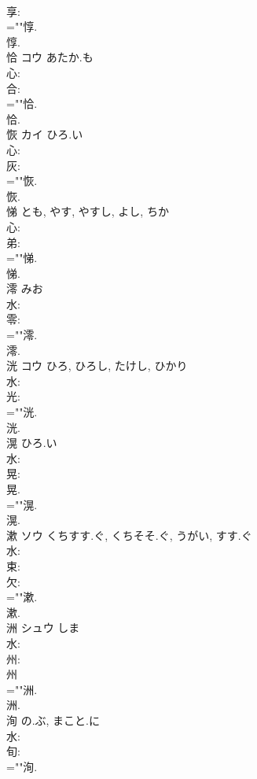 \documentclass[8pt]{extreport}
\begin{document}
\begin{CJK}{UTF8}{min}
\\	享: 
\\	=""惇.
\\	惇.
\\	恰	コウ	あたか.も		
\\	心: 
\\	合: 
\\	=""恰.
\\	恰.
\\	恢	カイ	ひろ.い		
\\	心: 
\\	灰: 
\\	=""恢.
\\	恢.
\\	悌			とも, やす, やすし, よし, ちか			
\\	心: 
\\	弟: 
\\	=""悌.
\\	悌.
\\	澪		みお				
\\	水: 
\\	零: 
\\	=""澪.
\\	澪.
\\	洸	コウ		ひろ, ひろし, たけし, ひかり	
\\	水: 
\\	光: 
\\	=""洸.
\\	洸.
\\	滉		ひろ.い				
\\	水: 
\\	晃: 
\\	晃.
\\	=""滉.
\\	滉.
\\	漱	ソウ	くちすす.ぐ, くちそそ.ぐ, うがい, すす.ぐ		
\\	水: 
\\	束: 
\\	欠: 
\\	=""漱.
\\	漱.
\\	洲	シュウ	しま		
\\	水: 
\\	州: 
\\	州 
\\	=""洲.
\\	洲.
\\	洵		の.ぶ, まこと.に				
\\	水: 
\\	旬: 
\\	=""洵.

\end{CJK}
\end{document}
